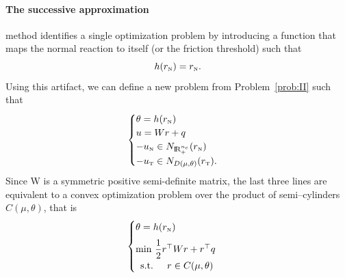 {%


\paragraph{The successive approximation} method identifies a single optimization problem by introducing a function that maps the normal reaction to itself (or the friction threshold) such that
\begin{equation}
  \label{eq:Haslinger-g}
  h(r_\n)  = r_\n.
\end{equation}
Using this artifact, we can define a new problem from Problem~\ref{prob:II} such that
\begin{equation}
  \label{eq:Haslinger-1}
  \begin{cases}
    \theta = h(r_\n) \\
    u = W r + q \\
    -u_{\n} \in N_{\RR^{n_c}_+}(r_\n) \\
    -u_{\t} \in N_{D(\mu,\theta)}(r_\t).
  \end{cases}
\end{equation}
Since W is a symmetric positive semi-definite  matrix, the last three lines are equivalent to a convex optimization problem over the product of semi--cylinders $C(\mu,\theta)$, that is
\begin{equation}
  \label{eq:Haslinger-2}
  \begin{cases}
    \theta = h(r_\n) \\[2mm]
    \min\, \Frac 1 2 r^\top W r + r^\top q \\
    \begin{array}{ll}
    \text{s.t. }& r \in C(\mu,\theta)
  \end{array}
  \end{cases}
\end{equation}

}
